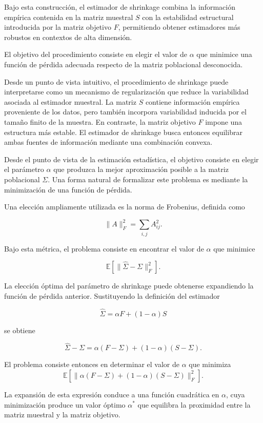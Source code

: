 \documentclass[letterpaper,12pt,oneside]{book}
\begin{document}
Bajo esta construcción, el estimador de shrinkage combina la información empírica contenida en la matriz muestral $S$ con la estabilidad estructural introducida por la matriz objetivo $F$, permitiendo obtener estimadores más robustos en contextos de alta dimensión.

El objetivo del procedimiento consiste en elegir el valor de $\alpha$ que minimice una función de pérdida adecuada respecto de la matriz poblacional desconocida.

Desde un punto de vista intuitivo, el procedimiento de shrinkage puede interpretarse como un mecanismo de regularización que reduce la variabilidad asociada al estimador muestral. La matriz $S$ contiene información empírica proveniente de los datos, pero también incorpora variabilidad inducida por el tamaño finito de la muestra. En contraste, la matriz objetivo $F$ impone una estructura más estable. El estimador de shrinkage busca entonces equilibrar ambas fuentes de información mediante una combinación convexa.

Desde el punto de vista de la estimación estadística, el objetivo consiste en elegir el parámetro $\alpha$ que produzca la mejor aproximación posible a la matriz poblacional $\Sigma$. Una forma natural de formalizar este problema es mediante la minimización de una función de pérdida.

Una elección ampliamente utilizada es la norma de Frobenius, definida como

\[
\|A\|_F^2 = \sum_{i,j} A_{ij}^2.
\]

Bajo esta métrica, el problema consiste en encontrar el valor de $\alpha$ que minimice

\[
\mathbb{E}\left[\|\hat{\Sigma} - \Sigma\|_F^2\right].
\]

La elección óptima del parámetro de shrinkage puede obtenerse expandiendo la función de pérdida anterior. Sustituyendo la definición del estimador

\[
\hat{\Sigma} = \alpha F + (1-\alpha)S
\]

se obtiene

\[
\hat{\Sigma} - \Sigma
=
\alpha(F-\Sigma) + (1-\alpha)(S-\Sigma).
\]

El problema consiste entonces en determinar el valor de $\alpha$ que minimiza
\[
\mathbb{E}\left[
\|
\alpha(F-\Sigma) + (1-\alpha)(S-\Sigma)
\|_F^2
\right].
\]

La expansión de esta expresión conduce a una función cuadrática en $\alpha$, cuya minimización produce un valor óptimo $\alpha^*$ que equilibra la proximidad entre la matriz muestral y la matriz objetivo.
\end{document}
